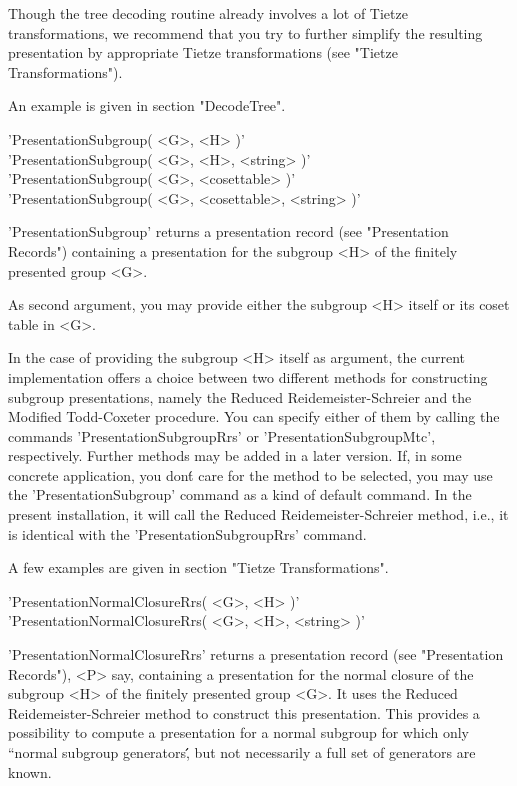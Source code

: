 Though  the tree   decoding routine  already  involves  a  lot of  Tietze
transformations,   we  recommend that you  try   to  further simplify the
resulting presentation by appropriate Tietze transformations (see "Tietze
Transformations").

An example is given in section "DecodeTree".

\vspace{5mm}
'PresentationSubgroup( <G>, <H> )'%
 \\
'PresentationSubgroup( <G>, <H>, <string> )' \\
'PresentationSubgroup( <G>, <cosettable> )' \\
'PresentationSubgroup( <G>, <cosettable>, <string> )'

'PresentationSubgroup' returns a presentation record  (see  "Presentation
Records") containing a presentation for the subgroup  <H> of the finitely
presented group <G>.

As second argument, you may provide either the subgroup <H> itself or its
coset table in <G>.

In  the case   of providing  the  subgroup  <H>  itself as  argument, the
current   {\GAP}  implementation offers a  choice   between two different
methods for  constructing   subgroup presentations,  namely   the Reduced
Reidemeister-Schreier and  the Modified  Todd-Coxeter procedure.  You can
specify either of  them by calling the commands 'PresentationSubgroupRrs'
or 'PresentationSubgroupMtc', respectively.  Further methods may be added
in a later {\GAP} version.  If, in  some concrete application, you don\'t
care  for   the    method   to    be selected,     you    may use     the
'PresentationSubgroup'  command  as a kind  of default  command.   In the
present installation,   it  will call  the  Reduced Reidemeister-Schreier
method, i.e., it is identical with the 'PresentationSubgroupRrs' command.

A few examples are given in section "Tietze Transformations".

\vspace{5mm}
'PresentationNormalClosureRrs( <G>, <H> )'%
 \\
'PresentationNormalClosureRrs( <G>, <H>, <string> )'

'PresentationNormalClosureRrs' returns   a  presentation record      (see
"Presentation Records"), <P>  say, containing   a  presentation for   the
normal closure of the  subgroup <H> of the  finitely presented group <G>.
It uses the  Reduced   Reidemeister-Schreier  method to  construct   this
presentation.  This provides a  possibility to compute a presentation for
a normal subgroup  for which only  ``normal subgroup generators\'\',  but
not necessarily a full set of generators are known.

